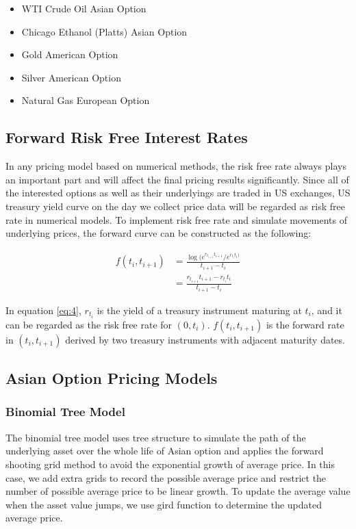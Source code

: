 \documentclass[10pt, a4paper, twocolumn]{article} %
\begin{document}
\begin{itemize}
\item WTI Crude Oil Asian Option
\item Chicago Ethanol (Platts) Asian Option
\item Gold American Option
\item Silver American Option
\item Natural Gas European Option
\end{itemize}

\subsection{Forward Risk Free Interest Rates}
In any pricing model based on numerical methods, the risk free rate always plays an important part and will affect the final pricing results significantly. Since all of the interested options as well as their underlyings are traded in US exchanges,  US treasury yield curve on the day we collect price data will be regarded as risk free rate in numerical models. To implement risk free rate and simulate movements of underlying prices, the forward curve can be constructed as the following:

\begin{equation} \label{eq:4}
\begin{aligned}
f(t_i, t_{i+1}) &= \frac {\log (e^{r_{t_{i+1}}t_{i+1}} / e^ {r_{t_i}t_i)}} {t_{i+1} - t_i}
\\
&= \frac {r_{t_{i+1}}t_{i+1} - r_{t_i}t_i}{t_{i+1} - t_i}
\end{aligned}
\end{equation}

In equation \ref{eq:4}, $r_{t_i}$ is the yield of a treasury instrument maturing at $t_i$, and it can be regarded as the risk free rate for $(0,t_i)$. $f(t_i, t_{i+1})$ is the forward rate in $(t_i, t_{i+1})$ derived by two treasury instruments with adjacent maturity dates.

\subsection{Asian Option Pricing Models}

\subsubsection{Binomial Tree Model}

The binomial tree model uses tree structure to simulate the path of the underlying asset over the whole life of Asian option and applies the forward shooting grid method to avoid the exponential growth of average price. In this case, we add extra grids to record the possible average price and restrict the number of possible average price to be linear growth. To update the average value when the asset value jumps, we use gird function to determine the updated average price.
\end{document}
